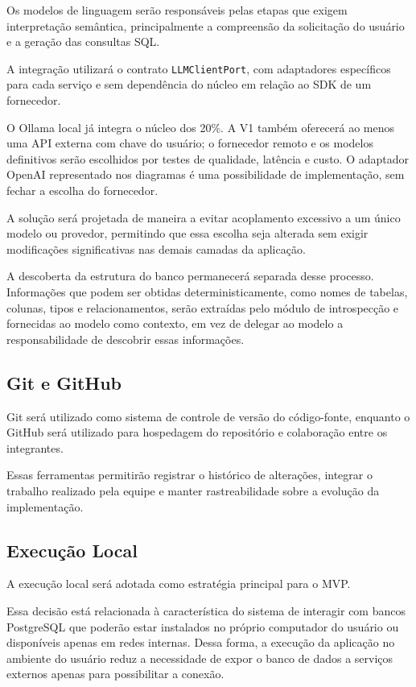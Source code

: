 Os modelos de linguagem serão responsáveis pelas etapas que exigem interpretação semântica, principalmente a compreensão da solicitação do usuário e a geração das consultas SQL.

A integração utilizará o contrato \texttt{LLMClientPort}, com adaptadores específicos para cada serviço e sem dependência do núcleo em relação ao SDK de um fornecedor.

O Ollama local já integra o núcleo dos 20\%. A V1 também oferecerá ao menos uma API externa com chave do usuário; o fornecedor remoto e os modelos definitivos serão escolhidos por testes de qualidade, latência e custo. O adaptador OpenAI representado nos diagramas é uma possibilidade de implementação, sem fechar a escolha do fornecedor.

A solução será projetada de maneira a evitar acoplamento excessivo a um único modelo ou provedor, permitindo que essa escolha seja alterada sem exigir modificações significativas nas demais camadas da aplicação.

A descoberta da estrutura do banco permanecerá separada desse processo. Informações que podem ser obtidas deterministicamente, como nomes de tabelas, colunas, tipos e relacionamentos, serão extraídas pelo módulo de introspecção e fornecidas ao modelo como contexto, em vez de delegar ao modelo a responsabilidade de descobrir essas informações.


\subsection{Git e GitHub}

Git será utilizado como sistema de controle de versão do código-fonte, enquanto o GitHub será utilizado para hospedagem do repositório e colaboração entre os integrantes.

Essas ferramentas permitirão registrar o histórico de alterações, integrar o trabalho realizado pela equipe e manter rastreabilidade sobre a evolução da implementação.


\subsection{Execução Local}

A execução local será adotada como estratégia principal para o MVP.

Essa decisão está relacionada à característica do sistema de interagir com bancos PostgreSQL que poderão estar instalados no próprio computador do usuário ou disponíveis apenas em redes internas. Dessa forma, a execução da aplicação no ambiente do usuário reduz a necessidade de expor o banco de dados a serviços externos apenas para possibilitar a conexão.

